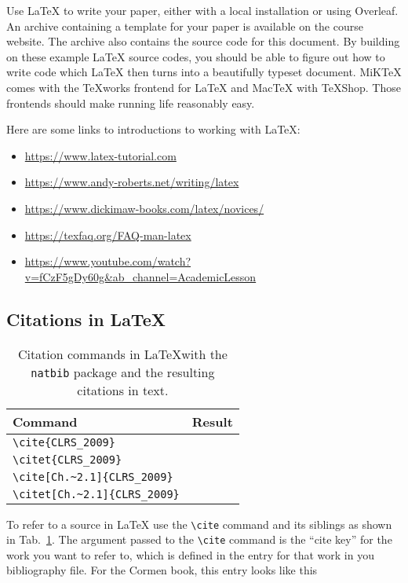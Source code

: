 \documentclass[sigconf, nonacm, natbib, screen, balance=False]{acmart}
\begin{document}
Use \LaTeX{} to write your paper, either with a local installation or
using Overleaf. An archive containing a template for your paper is
available on the course website. The archive also contains the source
code for this document. By building on these example \LaTeX{} source
codes, you should be able to figure out how to write code which
\LaTeX{} then turns into a beautifully typeset document.  MiKTeX comes
with the TeXworks frontend for LaTeX and MacTeX with TeXShop. Those
frontends should make running life reasonably easy.

Here are some links to introductions to working with \LaTeX{}:
\begin{itemize}
  \item \url{https://www.latex-tutorial.com}
\item \url{https://www.andy-roberts.net/writing/latex}
\item \url{https://www.dickimaw-books.com/latex/novices/}
\item \url{https://texfaq.org/FAQ-man-latex}
  \item \url{https://www.youtube.com/watch?v=fCzF5gDy60g&ab_channel=AcademicLesson}
\end{itemize}


\subsection{Citations in \LaTeX}

\begin{table}
  \begin{tabular}{ll}
    \hline
    Command & Result \\\hline
    \verb!\cite{CLRS_2009}! & \cite{CLRS_2009} \\
    \verb!\citet{CLRS_2009}! & \citet{CLRS_2009} \\
    \verb!\cite[Ch.~2.1]{CLRS_2009}! & \cite[Ch.~2.1]{CLRS_2009} \\
    \verb!\citet[Ch.~2.1]{CLRS_2009}! & \citet[Ch.~2.1]{CLRS_2009} \\\hline
    \end{tabular}
  \caption{Citation commands in \LaTeX with the \texttt{natbib} package
  and the resulting citations in text.}\label{tab:cite}
\end{table}


To refer to a source in \LaTeX{} use the \verb!\cite! command and its
siblings as shown in Tab.~\ref{tab:cite}. The argument passed to the
\verb!\cite! command is the ``cite key'' for the work you want to
refer to, which is defined in the entry for that work in you
bibliography file. For the Cormen book, this entry looks like this
\end{document}
